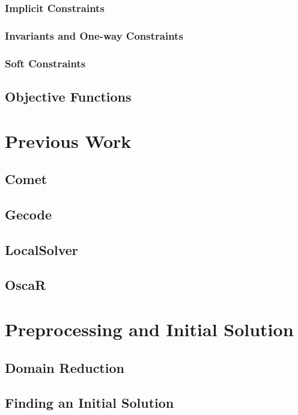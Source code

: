 \documentclass[a4paper,12pt]{article}
\begin{document}
    \subsubsection{Implicit Constraints}
    
    \subsubsection{Invariants and One-way Constraints}
    
    \subsubsection{Soft Constraints}
    
  \subsection{Objective Functions}
  

\section{Previous Work}
  \subsection{Comet}
  
  \subsection{Gecode}
  \subsection{LocalSolver}
  \subsection{OscaR}
  
\section{Preprocessing and Initial Solution}
  \subsection{Domain Reduction}
  
  \subsection{Finding an Initial Solution}
  
\end{document}
